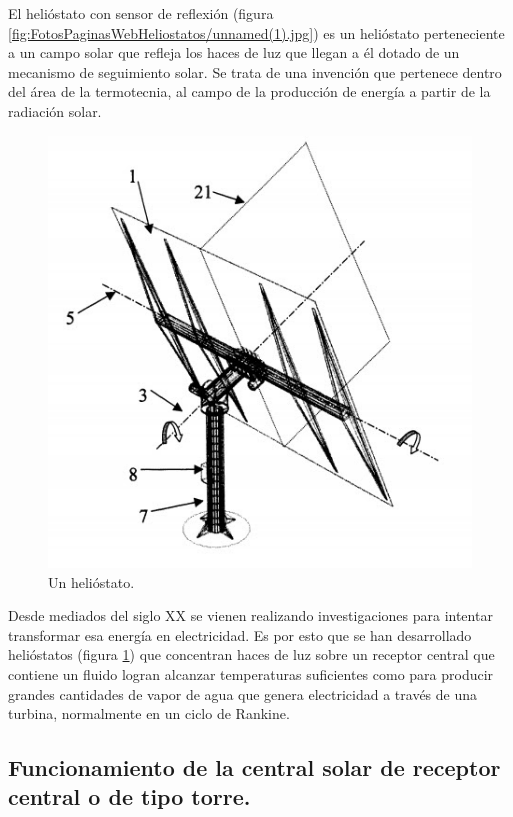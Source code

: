 El helióstato con sensor de reflexión (figura \ref{fig:FotosPaginasWebHeliostatos/unnamed(1).jpg}) es un helióstato perteneciente a un campo solar que refleja los haces de luz que llegan a él dotado de un mecanismo de seguimiento solar. Se trata de una invención que pertenece dentro del área de la termotecnia, al campo de la producción de energía a partir de la radiación solar.

\begin{figure}[h!]
  	\centering
	\includegraphics[scale=0.7]{FotosPaginasWebHeliostatos/unnamed.jpg}
	\caption{Un helióstato.~\cite{OepmWebSite} \label{fig:FotosPaginasWebHeliostatos/unnamed.jpg}}
\end{figure}

Desde mediados del siglo XX se vienen realizando investigaciones para intentar transformar esa energía en electricidad. Es por esto que se han desarrollado helióstatos (figura \ref{fig:FotosPaginasWebHeliostatos/unnamed.jpg}) que concentran haces de luz sobre un receptor central que contiene un fluido logran alcanzar temperaturas suficientes como para producir grandes cantidades de vapor de agua que genera electricidad a través de una turbina, normalmente en un ciclo de Rankine.

\cite{GstriatumWebSite} \cite{EcuRedWebSite}

\subsection{Funcionamiento de la central solar de receptor central o de tipo torre.}

